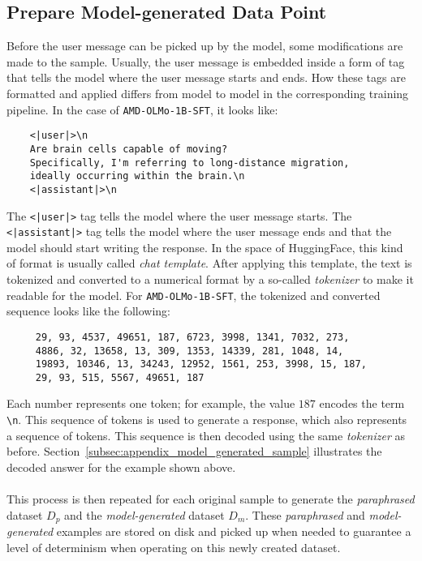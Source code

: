 \subsection{Prepare Model-generated Data Point}\label{subsec:prepare_model_input}
Before the user message can be picked up by the model, some modifications are made to the sample. Usually, the user message is embedded inside a form of tag that tells the model where the user message starts and ends. How these tags are formatted and applied differs from model to model in the corresponding training pipeline. In the case of \texttt{AMD-OLMo-1B-SFT}, it looks like:
\begin{verbatim}
    <|user|>\n
    Are brain cells capable of moving? 
    Specifically, I'm referring to long-distance migration, 
    ideally occurring within the brain.\n
    <|assistant|>\n
\end{verbatim}
The \texttt{<|user|>} tag tells the model where the user message starts. The \texttt{<|assistant|>} tag tells the model where the user message ends and that the model should start writing the response. In the space of HuggingFace, this kind of format is usually called \emph{chat template}. After applying this template, the text is tokenized and converted to a numerical format by a so-called \emph{tokenizer} to make it readable for the model. For \texttt{AMD-OLMo-1B-SFT}, the tokenized and converted sequence looks like the following:
\begin{verbatim}
     29, 93, 4537, 49651, 187, 6723, 3998, 1341, 7032, 273,
     4886, 32, 13658, 13, 309, 1353, 14339, 281, 1048, 14,
     19893, 10346, 13, 34243, 12952, 1561, 253, 3998, 15, 187,
     29, 93, 515, 5567, 49651, 187
\end{verbatim}
Each number represents one token; for example, the value $187$ encodes the term \texttt{\textbackslash n}. This sequence of tokens is used to generate a response, which also represents a sequence of tokens. This sequence is then decoded using the same \emph{tokenizer} as before. Section~\ref{subsec:appendix_model_generated_sample} illustrates the decoded answer for the example shown above.
\\\\
This process is then repeated for each original sample to generate the \emph{paraphrased} dataset $D_p$ and the \emph{model-generated} dataset $D_m$. These \emph{paraphrased} and \emph{model-generated} examples are stored on disk and picked up when needed to guarantee a level of determinism when operating on this newly created dataset. 

